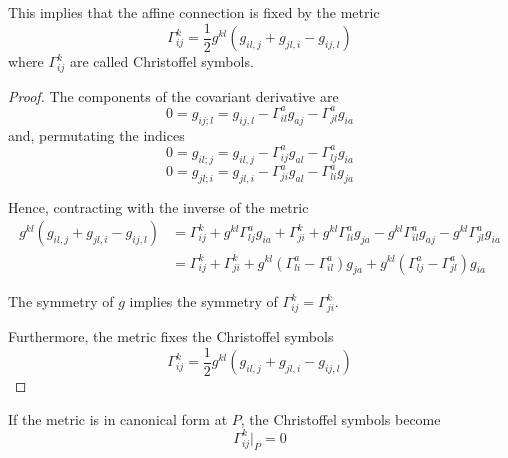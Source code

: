     This implies that the affine connection is fixed by the metric 
    \begin{equation}\label{chr}
        \Gamma^k_{ij} = \frac{1}{2} g^{kl} (g_{il,j} + g_{jl,i} - g_{ij,l})
    \end{equation}
    where $\Gamma^k_{ij}$ are called Christoffel symbols.

    \begin{proof}
        The components of the covariant derivative are 
        \begin{equation*}
            0 = g_{ij;l} = g_{ij,l} - \Gamma^a_{il} g_{aj} - \Gamma^a_{jl} g_{ia}
        \end{equation*}
        and, permutating the indices
        \begin{equation*}
            0 = g_{il;j} = g_{il,j} - \Gamma^a_{ij} g_{al} - \Gamma^a_{lj} g_{ia}
        \end{equation*}
        \begin{equation*}
            0 = g_{jl;i} = g_{jl,i} - \Gamma^a_{ji} g_{al} - \Gamma^a_{li} g_{ja}
        \end{equation*}

        Hence, contracting with the inverse of the metric
        \begin{equation*}
        \begin{aligned}
            g^{kl} (g_{il,j} + g_{jl,i} - g_{ij,l}) & = \Gamma^k_{ij} + g^{kl} \Gamma^a_{lj} g_{ia} + \Gamma^k_{ji} + g^{kl} \Gamma^a_{li} g_{ja} - g^{kl} \Gamma^a_{il} g_{aj} - g^{kl} \Gamma^a_{jl} g_{ia} \\ & = \Gamma^k_{ij} + \Gamma^k_{ji} + g^{kl} (\Gamma^a_{li} - \Gamma^a_{il}) g_{ja} + g^{kl} (\Gamma^a_{lj} - \Gamma^a_{jl}) g_{ia}
        \end{aligned}
        \end{equation*}

        The symmetry of $g$ implies the symmetry of $\Gamma^k_{ij} = \Gamma^k_{ji}$.

        Furthermore, the metric fixes the Christoffel symbols 
        \begin{equation*}
            \Gamma^k_{ij} = \frac{1}{2} g^{kl} (g_{il,j} + g_{jl,i} - g_{ij,l})
        \end{equation*}
    \end{proof}

    If the metric is in canonical form at $P$, the Christoffel symbols become 
    \begin{equation*}
        \Gamma^k_{ij} \vert_P = 0
    \end{equation*}

